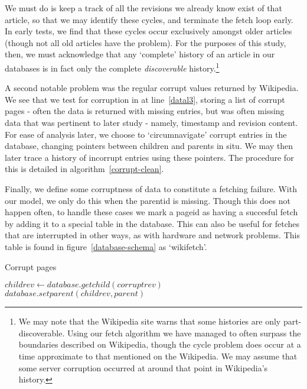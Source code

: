 We must do is keep a track of all the revisions we already know exist
of that article, so that we may identify these cycles, and terminate
the fetch loop early. In early tests, we find that these cycles occur
exclusively amongst older articles (though not all old articles have
the problem). For the purposes of this study, then, we must
acknowledge that any `complete' history of an article in our databases
is in fact only the complete \textit{discoverable}
history.\footnote{We may note that the Wikipedia site warns that some
  histories are only part-discoverable. Using our fetch algorithm we
  have managed to often surpass the boundaries described on Wikipedia,
  though the cycle problem does occur at a time approximate to that
  mentioned on the Wikipedia. We may assume that some server
  corruption occurred at around that point in Wikipedia's history.}

A second notable problem was the regular corrupt values returned by
Wikipedia. We see that we test for corruption in at line~\ref{datal3},
storing a list of corrupt pages - often the data is returned with
missing entries, but was often missing data that was pertinent to
later study - namely, timestamp and revision content. For ease of
analysis later, we choose to `circumnavigate' corrupt entries in the
database, changing pointers between children and parents in situ. We
may then later trace a history of incorrupt entries using these
pointers. The procedure for this is detailed in
algorithm~\ref{corrupt-clean}.

Finally, we define some corruptness of data to constitute a fetching
failure. With our model, we only do this when the parentid is
missing. Though this does not happen often, to handle these cases we
mark a pageid as having a succesful fetch by adding it to a special
table in the database. This can also be useful for fetches that are
interrupted in other ways, as with hardware and network problems. This
table is found in figure~\ref{database-schema} as `wikifetch'. 

\begin{algorithm}
  \caption{Corrupt pages}\label{corrupt-clean}
  \begin{algorithmic}
    \State $childrev \gets database.getchild(corruptrev)$
    \State $database.setparent(childrev, parent)$ 
    \EndProcedure
  \end{algorithmic}
\end{algorithm}

